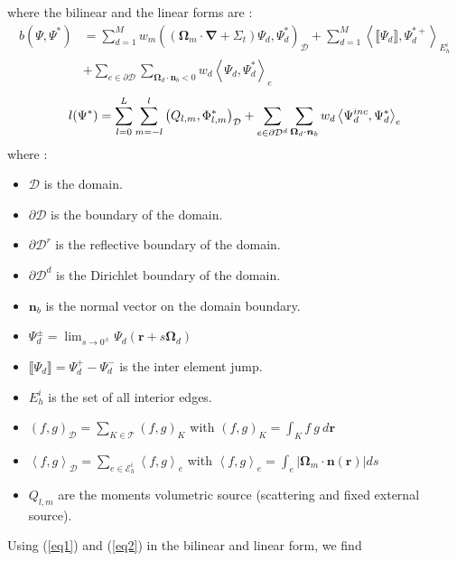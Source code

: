 where the bilinear and the linear forms are :
\begin{equation}
\begin{split}
b(\Psi,\Psi^*) &= \sum_{d=1}^M w_m \left(\left(\boldsymbol{\Omega}_m \cdot \boldsymbol{\nabla}+\Sigma_t\right)\Psi_d,\Psi_d^*\right)_{\mathcal{D}} + \sum_{d=1}^M \left\langle\llbracket\Psi_d\rrbracket,\Psi_d^{*+}\right\rangle_{E_h^i}\\
&+\sum_{e\in\partial \mathcal{D}} \sum_{\boldsymbol{\Omega}_d \cdot \boldsymbol{n}_b < 0} w_d \left\langle\Psi_d,\Psi_d^*\right\rangle_e
\end{split}
\end{equation}
\begin{equation}
l(\Psi^*) = \sum_{l=0}^L \sum_{m=-l}^l
\left(Q_{l,m},\Phi_{l,m}^*\right)_{\mathcal{D}} + \sum_{e\in\partial
\mathcal{D}^d} \sum_{\boldsymbol{\Omega}_d \cdot \boldsymbol{n}_b} w_d
\left\langle\Psi_d^{inc},\Psi_d^*\right\rangle_e
\end{equation}
where :
\begin{itemize}
\item $\mathcal{D}$  is the domain. 
\item $\partial\mathcal{D}$ is the boundary of the domain.
\item $\partial\mathcal{D}^r$ is the reflective boundary of the domain.
\item $\partial\mathcal{D}^d$ is the Dirichlet boundary of the domain.
\item $\boldsymbol{n}_b$ is the normal vector on the domain boundary.
\item $\Psi_d^{\pm} = \lim_{s\to 0^{\pm}} \Psi_d (\boldsymbol{r} + s \boldsymbol{\Omega}_d)$
\item $\llbracket\Psi_d\rrbracket = \Psi_d^+ - \Psi_d^-$ is the inter element jump.
\item $E_h^i$ is the set of all interior edges.
\item $(f,g)_{\mathcal{D}} = \sum_{K \in \mathcal{T}} (f,g)_K$ with  $(f,g)_K = \int_K f\ g\ d\mathbf{r}$
\item $\left\langle f,g\right\rangle_{\mathcal{D}} = \sum_{e \in \mathcal{E}_h^i} \left\langle f,g\right\rangle_e$ with  $\left\langle f,g\right\rangle_e = \int_e \left| \boldsymbol{\Omega}_m \cdot \boldsymbol{n}(\mathbf{r})\right| ds$
\item $Q_{l,m}$ are the moments volumetric source (scattering and fixed external source).
\end{itemize}
Using (\ref{eq1}) and (\ref{eq2}) in the bilinear and  linear form, we find
